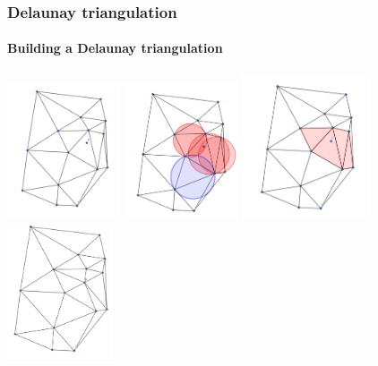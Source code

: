 \documentclass[c, 10pt]{beamer}
\begin{document}
\begin{frame}\frametitle{Delaunay triangulation}\framesubtitle{Building a Delaunay triangulation}
\begin{center}
\includegraphics[height = 4cm]{./FigureLayout/DelaunayAdd.png}
\includegraphics[height = 4cm]{./FigureLayout/DelaunayAdd2.png}
\vspace{1mm}
\includegraphics[height = 4.3cm]{./FigureLayout/DelaunayAdd3.png}
\includegraphics[height = 4cm]{./FigureLayout/DelaunayAdd4.png}
\end{center}


\end{frame}
\end{document}
